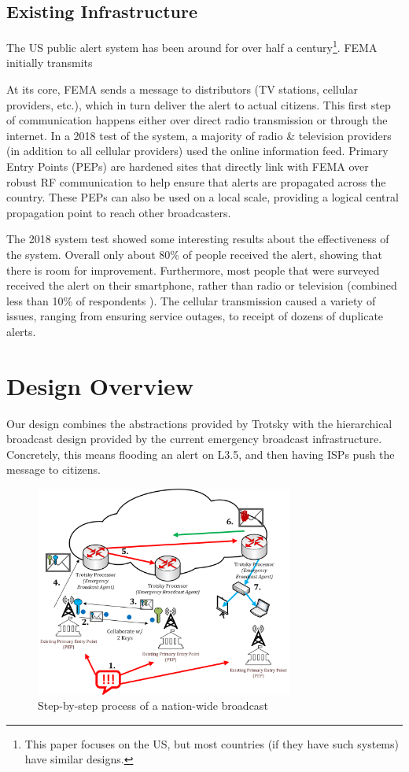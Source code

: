 \subsection{Existing Infrastructure}\label{infrabckgrnd}
The US public alert system has been around for over half a century\footnote{This paper focuses on the US, but most countries (if they have such systems) have similar designs.}. FEMA initially transmits

At its core, FEMA sends a message to distributors (TV stations, cellular providers, etc.), which in turn deliver the alert to actual citizens. This first step of communication happens either over direct radio transmission or through the internet. In a 2018 test of the system, a majority of radio \& television providers (in addition to all cellular providers) used the online information feed. Primary Entry Points (PEPs) are hardened sites that directly link with FEMA over robust RF communication to help ensure that alerts are propagated across the country. These PEPs can also be used on a local scale, providing a logical central propagation point to reach other broadcasters. \cite{ipaws101} 

The 2018 system test showed some interesting results about the effectiveness of the system. Overall only about 80\% of people received the alert, showing that there is room for improvement. Furthermore, most people that were surveyed received the alert on their smartphone, rather than radio or television (combined less than 10\% of respondents ). The cellular transmission caused a variety of issues, ranging from ensuring service outages, to receipt of dozens of duplicate alerts.\cite{weatest,everbridge}

\section{Design Overview}
Our design combines the abstractions provided by Trotsky with the hierarchical broadcast design provided by the current emergency broadcast infrastructure. Concretely, this means flooding an alert on L3.5, and then having ISPs push the message to citizens. 

\begin{figure}[tp]
\centering
\includegraphics[width=8.5cm]{figures/full_diagram_v2.png}
\caption{Step-by-step process of a nation-wide broadcast}
\label{fig:brdcast}
\end{figure}


